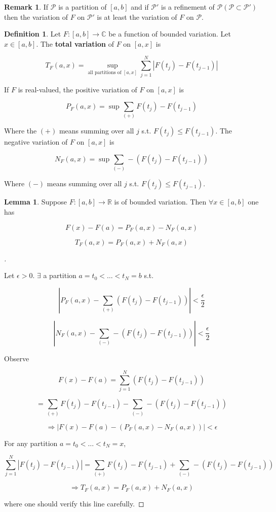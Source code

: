 \documentclass{article}
\theoremstyle{definition}
\newtheorem{lem}{Lemma}
\newtheorem{dfn}{Definition}
\newtheorem{rem}{Remark}
\newenvironment{proofs}[1][\proofname]{%
  \begin{proof}[#1]$ $\par\nobreak\ignorespaces
}{%
  \end{proof}
}
\begin{document}
\begin{rem}
  If $\mathcal{P}$ is a partition of $[a, b]$ and if $\mathcal{P}'$ is a refinement of $\mathcal{P} (\mathcal{P} \subset \mathcal{P}')$ then the variation of $F$ on $\mathcal{P}'$ is at least the variation of $F$ on $\mathcal{P}$. 
\end{rem}

\begin{dfn}
  Let $F:[a, b] \rightarrow \mathbb{C}$ be a function of bounded variation. Let $x \in [a, b]$. The \textbf{total variation} of $F$ on $[a, x]$ is 

  $$T_F(a, x) = \sup_{\text{all partitions of } [a, x]} \sum_{j = 1}^N |F(t_j) - F(t_{j - 1})|$$

  If $F$ is real-valued, the positive variation of $F$ on $[a,x]$ is 

  $$P_F (a, x) = \sup \sum_{(+)} F(t_j) - F(t_{j - 1})$$

  Where the $(+)$ means summing over all $j$ s.t. $F(t_j) \leq F(t_{j - 1})$. The negative variation of $F$ on $[a, x]$ is

  $$N_F (a, x) = \sup \sum_{(-)} - (F(t_j) - F(t_{j - 1}))$$

  Where $(-)$ means summing over all $j$ s.t. $F(t_j) \leq F(t_{j - 1})$. 
\end{dfn}

\begin{lem}
  Suppose $F:[a, b] \rightarrow \mathbb{R}$ is of bounded variation. Then $\forall x \in [a, b]$ one has

  $$F(x) - F(a) = P_F (a, x) - N_F(a, x)$$

  $$T_F(a, x) = P_F(a, x) + N_F(a, x)$$
\end{lem}

\begin{proofs}
  Let $\epsilon > 0$. $\exists$ a partition $a = t_0 < \hdots < t_N = b$ s.t. 

  $$|P_F(a, x) - \sum_{(+)} (F(t_j) - F(t_{j - 1}))| < \frac{\epsilon}{2}$$

  
  $$|N_F(a, x) - \sum_{(-)} - (F(t_j) - F(t_{j - 1}))| < \frac{\epsilon}{2}$$

  Observe 

  $$F(x) - F(a) = \sum_{j = 1}^N (F(t_j) - F(t_{j - 1}))$$

  $$ = \sum_{(+)} F(t_j) - F(t_{j - 1}) - \sum_{(-)} -(F(t_j) - F(t_{j - 1}))$$

  $$\Rightarrow  |F(x) - F(a) - (P_F(a, x) - N_F(a, x))| < \epsilon$$

  For any partition $a = t_0 < \hdots < t_N = x$, 

  $$\sum_{j = 1}^N |F(t_j) - F(t_{j - 1})| = \sum_{(+)} F(t_j) - F(t_{j - 1}) + \sum_{(-)} -(F(t_j) - F(t_{j - 1}))$$

  $$\Rightarrow T_F(a, x) = P_F(a, x) + N_F(a, x)$$

  where one should verify this line carefully.
  

\end{proofs}
\end{document}
